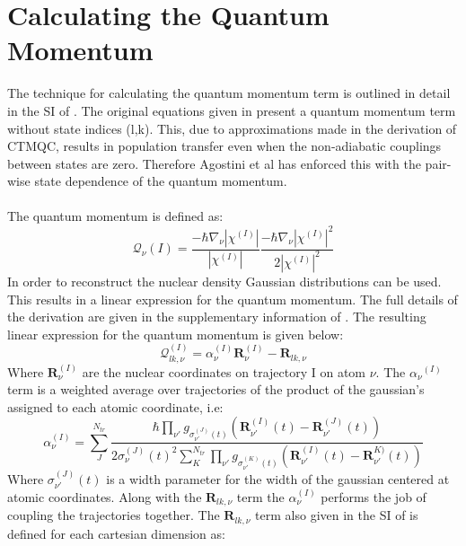 \section{Calculating the Quantum Momentum}
 The technique for calculating the quantum momentum term is outlined in detail in the SI of \cite{min_ab_2017}. The original equations given in \cite{agostini_quantum-classical_2016} present a quantum momentum term without state indices (l,k). This, due to approximations made in the derivation of CTMQC, results in population transfer even when the non-adiabatic couplings between states are zero. Therefore Agostini et al has enforced this with the pair-wise state dependence of the quantum momentum.
 \\\\
The quantum momentum is defined as:
\begin{equation}
  \mathcal{Q}_{\nu}{(I)} = \frac{-\hbar \nabla_{\nu} |\chi^{(I)}|}{|\chi^{(I)}|} \frac{-\hbar \nabla_{\nu} |\chi^{(I)}|^2}{2|\chi^{(I)}|^2}
  \label{eq:QM_def}
\end{equation}
In order to reconstruct the nuclear density Gaussian distributions can be used. This results in a linear expression for the quantum momentum.
The full details of the derivation are given in the supplementary information of \cite{min_ab_2017}. The resulting linear expression for the quantum momentum is given below:
\begin{equation}
  \mathcal{Q}_{lk, \nu}^{(I)} = \alpha_{\nu}^{(I)} \textbf{R}_{\nu}^{(I)} - \textbf{R}_{lk, \nu}
  \label{eq:QM_lin}
\end{equation}
Where $\textbf{R}_{\nu}^{(I)}$ are the nuclear coordinates on trajectory I on atom $\nu$. The $\alpha_{\nu}{^(I)}$ term is a weighted average over trajectories of the product of the gaussian's assigned to each atomic coordinate, i.e:
\begin{equation}
  \alpha_{\nu}^{(I)} = \sum_{J}^{N_{tr}} \frac{\hbar \prod_{\nu'} g_{\sigma_{\nu'}^{(J)}(t)}\left(\textbf{R}_{\nu'}^{(I)}(t) - \textbf{R}_{\nu'}^{(J)}(t)\right)}   {2 \sigma_{\nu}^{(J)}(t)^2\sum_{K}^{N_{tr}}\prod_{\nu'} g_{\sigma_{\nu'}^{(K)}(t)}\left(\textbf{R}_{\nu'}^{(I)}(t) - \textbf{R}_{\nu'}^{K)}(t)\right)}
  \label{eq:alpha}
\end{equation}
Where $\sigma_{\nu'}^{(J)}(t)$ is a width parameter for the width of the gaussian centered at atomic coordinates. Along with the $\textbf{R}_{lk, \nu}$ term the $\alpha_{\nu}^{(I)}$ performs the job of coupling the trajectories together. The $\textbf{R}_{lk, \nu}$ term also given in the SI of \cite{min_ab_2017} is defined for each cartesian dimension as:
